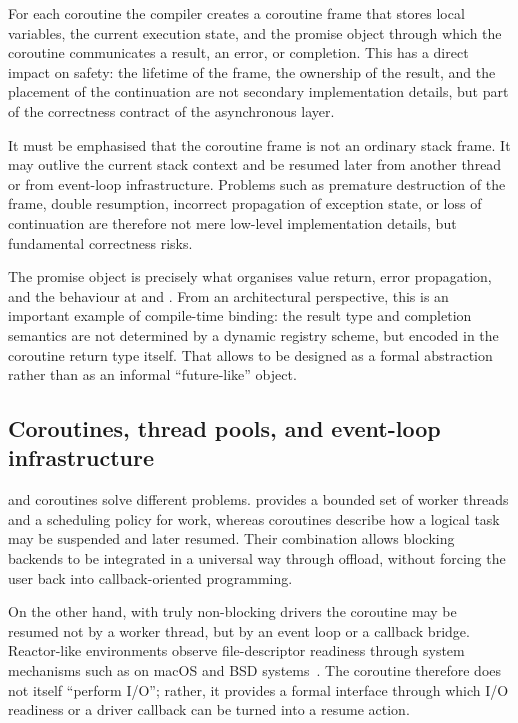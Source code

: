 For each coroutine the compiler creates a coroutine frame that stores local variables, the current execution state, and the promise object through which the coroutine communicates a result, an error, or completion. This has a direct impact on safety: the lifetime of the frame, the ownership of the result, and the placement of the continuation are not secondary implementation details, but part of the correctness contract of the asynchronous layer.

It must be emphasised that the coroutine frame is not an ordinary stack frame. It may outlive the current stack context and be resumed later from another thread or from event-loop infrastructure. Problems such as premature destruction of the frame, double resumption, incorrect propagation of exception state, or loss of continuation are therefore not mere low-level implementation details, but fundamental correctness risks.

The promise object is precisely what organises value return, error propagation, and the behaviour at  and . From an architectural perspective, this is an important example of compile-time binding: the result type and completion semantics are not determined by a dynamic registry scheme, but encoded in the coroutine return type itself. That allows  to be designed as a formal abstraction rather than as an informal “future-like” object.

\subsection{Coroutines, thread pools, and event-loop infrastructure}

 and coroutines solve different problems.  provides a bounded set of worker threads and a scheduling policy for work, whereas coroutines describe how a logical task may be suspended and later resumed. Their combination allows blocking backends to be integrated in a universal way through offload, without forcing the user back into callback-oriented programming.

On the other hand, with truly non-blocking drivers the coroutine may be resumed not by a worker thread, but by an event loop or a callback bridge. Reactor-like environments observe file-descriptor readiness through system mechanisms such as  on macOS and BSD systems~\cite{kqueue_man}. The coroutine therefore does not itself “perform I/O”; rather, it provides a formal interface through which I/O readiness or a driver callback can be turned into a resume action.

